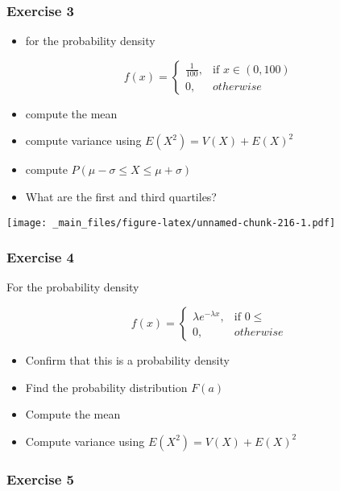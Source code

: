 \documentclass[
]{book}
\providecommand{\tightlist}{%
  \setlength{\itemsep}{0pt}\setlength{\parskip}{0pt}}
\begin{document}
\hypertarget{exercise-3-1}{%
\subsubsection{Exercise 3}\label{exercise-3-1}}

\begin{itemize}
\tightlist
\item
  for the probability density
\end{itemize}

\[
    f(x)= 
\begin{cases}
    \frac{1}{100},& \text{if } x\in (0,100)\\
    0,& otherwise 
\end{cases}
\]

\begin{itemize}
\tightlist
\item
  compute the mean
\item
  compute variance using \(E(X^2)=V(X)+E(X)^2\)
\item
  compute \(P(\mu-\sigma\leq X \leq \mu+\sigma)\)
\item
  What are the first and third quartiles?
\end{itemize}

\texttt{[image: \_main\_files/figure-latex/unnamed-chunk-216-1.pdf]}

\hypertarget{exercise-4-1}{%
\subsubsection{Exercise 4}\label{exercise-4-1}}

For the probability density

\[
    f(x)= 
\begin{cases}
    \lambda e^{-\lambda x},& \text{if } 0 \leq\\
    0,& otherwise 
\end{cases}
\]

\begin{itemize}
\tightlist
\item
  Confirm that this is a probability density
\item
  Find the probability distribution \(F(a)\)
\item
  Compute the mean
\item
  Compute variance using \(E(X^2)=V(X)+E(X)^2\)
\end{itemize}

\hypertarget{exercise-5-1}{%
\subsubsection{Exercise 5}\label{exercise-5-1}}
\end{document}
